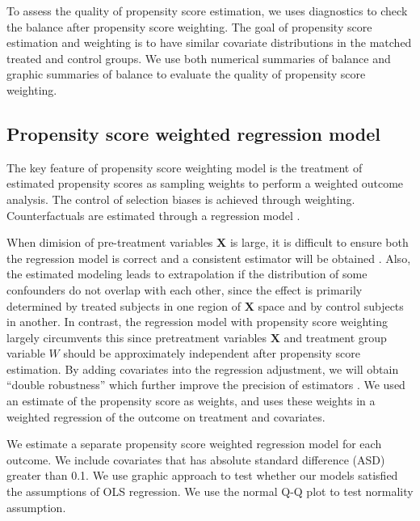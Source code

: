 To assess the quality of propensity score estimation, we uses diagnostics to check the balance after propensity score weighting. The goal of propensity score estimation and weighting is to have similar covariate distributions in the matched treated and control groups. We use both numerical summaries of balance and graphic summaries of balance to evaluate the quality of propensity score weighting.

\subsection{Propensity score weighted regression model}
The key feature of propensity score weighting model is the treatment of estimated propensity scores as sampling weights to perform a weighted outcome analysis. The control of selection biases is achieved through weighting. Counterfactuals are estimated through a regression model \citep{guo2009propensity}.

When dimision of pre-treatment variables $\textbf{X}$ is large, it is difficult to ensure both the regression model is correct and a consistent estimator will be obtained \citep{rubin1997estimating}. Also, the estimated modeling leads to extrapolation if the distribution of some confounders do not overlap with each other, since the effect is primarily determined by treated subjects in one region of $\textbf{X}$ space and by control subjects in another. In contrast, the regression model with propensity score weighting largely circumvents this since pretreatment variables $\textbf{X}$ and treatment group variable $W$ should be approximately independent after propensity score estimation. By adding covariates into the regression adjustment, we will obtain ``double robustness'' which further improve the precision of estimators \citep{lunceford2004stratification}. We used an estimate of the propensity score as weights, and uses these weights in a weighted regression of the outcome on treatment and covariates.

We estimate a separate propensity score weighted regression model for each outcome. We include covariates that has absolute standard difference (ASD) greater than 0.1. We use graphic approach to test whether our models satisfied the assumptions of OLS regression. We use the normal Q-Q plot to test normality assumption. 
